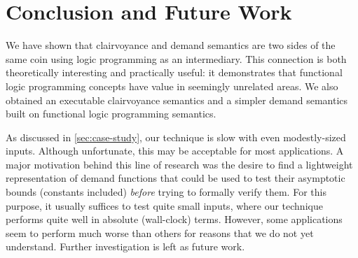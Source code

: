 \section{Conclusion and Future Work}\label{sec:conclusion}

We have shown that clairvoyance and demand semantics are two sides of the same
coin using logic programming as an intermediary. This connection is both
theoretically interesting and practically useful: it demonstrates that
functional logic programming concepts have value in seemingly unrelated
areas. We also obtained an executable clairvoyance semantics and a simpler demand
semantics built on functional logic programming semantics.

As discussed in \cref{sec:case-study}, our technique is slow with even
modestly-sized inputs. Although unfortunate, this may be acceptable for most applications. A major
motivation behind this line of research was the desire to find a lightweight
representation of demand functions that could be used to test their asymptotic
bounds (constants included) \emph{before} trying to formally verify them. For
this purpose, it usually suffices to test quite small inputs, where our
technique performs quite well in absolute (wall-clock) terms. However, some
applications seem to perform much worse than others for reasons that we do not
yet understand. Further investigation is left as future work.

